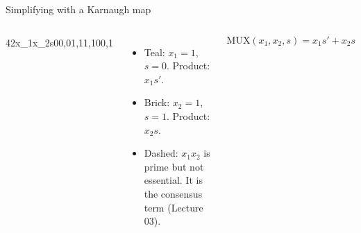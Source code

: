 \documentclass[10pt]{wosm-slides}
\newenvironment{kmapmux}
  {\begin{kmap}{4}{2}{x_1x_2}{s}{00,01,11,10}{0,1}}
  {\end{kmap}}
\begin{document}
\begin{frame}{Simplifying with a Karnaugh map}
  \begin{columns}[c, totalwidth=\textwidth]
      \centering
      \begin{kmapmux}
      \end{kmapmux}
      \begin{itemize}
        \item \textcolor{wosm-accent}{Teal}: $x_1 = 1$, $s = 0$. Product: $x_1 s'$.
        \item \textcolor{wosm-brick}{Brick}: $x_2 = 1$, $s = 1$. Product: $x_2 s$.
        \item Dashed: $x_1 x_2$ is prime but not essential. It is the consensus term
          (Lecture 03).
      \end{itemize}
      \medskip
      \[ \mathrm{MUX}(x_1, x_2, s) = x_1 s' + x_2 s \]
  \end{columns}

  \medskip
\end{frame}
\end{document}
